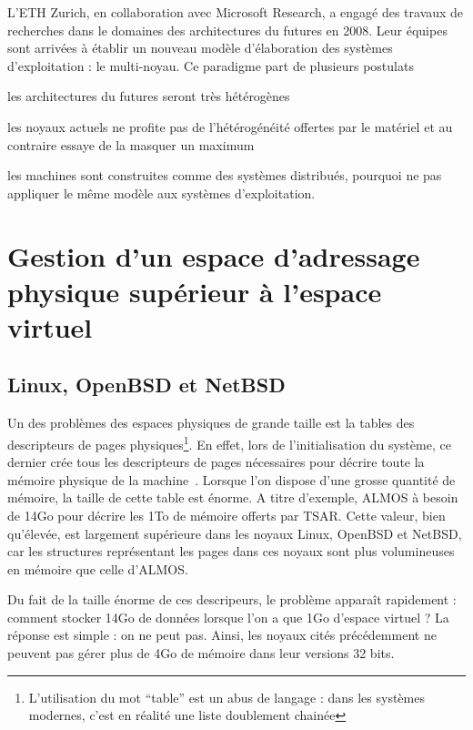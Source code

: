       L’ETH Zurich, en collaboration avec Microsoft Research, a engagé des
      travaux de recherches dans le domaines des architectures du futures en
      2008. Leur équipes sont arrivées à établir un nouveau modèle d’élaboration
      des systèmes d’exploitation : le multi-noyau. Ce paradigme part de
      plusieurs postulats\benumline \item les architectures du futures seront très
      hétérogènes\item les noyaux actuels ne profite pas de l’hétérogénéité
      offertes par le matériel et au contraire essaye de la masquer un maximum
      \item les machines sont construites comme des systèmes distribués, pourquoi
      ne pas appliquer le même modèle aux systèmes d’exploitation\eenumline.

      
  \section{Gestion d’un espace d’adressage physique supérieur à l’espace virtuel}

    \subsection{Linux, OpenBSD et NetBSD}
  
      Un des problèmes des espaces physiques de grande taille est la tables des
      descripteurs de pages physiques\footnote{L’utilisation du mot “table” est
        un abus de langage : dans les systèmes modernes, c’est en réalité une
        liste doublement chainée}. En effet, lors de l’initialisation du
      système, ce dernier crée tous les descripteurs de pages nécessaires pour
      décrire toute la mémoire physique de la
      machine~\citep{bsdvm,linuxvm}. Lorsque l’on dispose d’une grosse quantité
      de mémoire, la taille de cette table est énorme. A titre d’exemple, ALMOS
      à besoin de 14Go pour décrire les 1To de mémoire offerts par TSAR. Cette
      valeur, bien qu’élevée, est largement supérieure dans les noyaux Linux,
      OpenBSD et NetBSD, car les structures représentant les pages dans ces
      noyaux sont plus volumineuses en mémoire que celle d’ALMOS.

      Du fait de la taille énorme de ces descripeurs, le problème apparaît
      rapidement : comment stocker 14Go de données lorsque l’on a que 1Go
      d’espace virtuel ?  La réponse est simple : on ne peut pas.  Ainsi, les
      noyaux cités précédemment ne peuvent pas gérer plus de 4Go de mémoire dans
      leur versions 32 bits.


